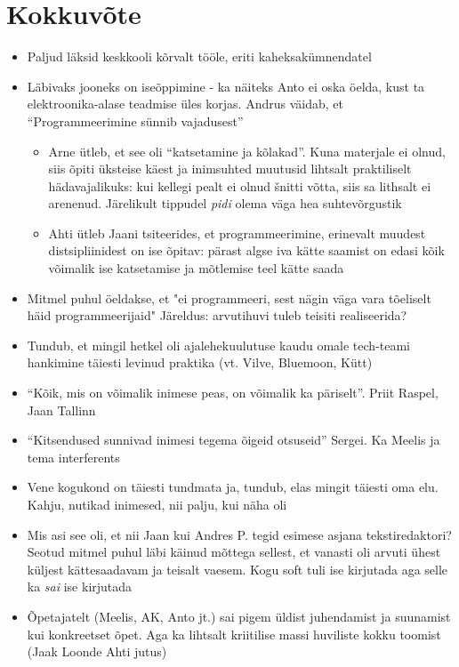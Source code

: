 \documentclass{tufte-book}
\begin{document}
\chapter{Kokkuvõte}
\begin{itemize}
	\item Paljud läksid keskkooli kõrvalt tööle, eriti kaheksakümnendatel
	\item Läbivaks jooneks on iseõppimine - ka näiteks Anto ei oska öelda, kust ta elektroonika-alase teadmise üles korjas. Andrus väidab, et \enquote{Programmeerimine sünnib vajadusest}
	\begin{itemize}
		\item Arne ütleb, et see oli \enquote{katsetamine ja kõlakad}. Kuna materjale ei olnud, siis õpiti üksteise käest ja inimsuhted muutusid lihtsalt praktiliselt hädavajalikuks: kui kellegi pealt ei olnud šnitti võtta, siis sa lithsalt ei arenenud. Järelikult tippudel \emph{pidi} olema väga hea suhtevõrgustik
		\item Ahti ütleb Jaani tsiteerides, et programmeerimine, erinevalt muudest distsipliinidest on ise õpitav: pärast algse iva kätte saamist on edasi kõik võimalik ise katsetamise ja mõtlemise teel kätte saada
	\end{itemize}
	\item Mitmel puhul öeldakse, et "ei programmeeri, sest nägin väga vara tõeliselt häid programmeerijaid" Järeldus: arvutihuvi tuleb teisiti realiseerida?
	\item Tundub, et mingil hetkel oli ajalehekuulutuse kaudu omale tech-teami hankimine täiesti levinud praktika (vt. Vilve, Bluemoon, Kütt)
	\item \enquote{Kõik, mis on võimalik inimese peas, on võimalik ka päriselt}. Priit Raspel, Jaan Tallinn
	\item \enquote{Kitsendused sunnivad inimesi tegema õigeid otsuseid} Sergei. Ka Meelis ja tema interferents
	\item Vene kogukond on täiesti tundmata ja, tundub, elas mingit täiesti oma elu. Kahju, nutikad inimesed, nii palju, kui näha oli
	\item Mis asi see oli, et nii Jaan kui Andres P. tegid esimese asjana tekstiredaktori? Seotud mitmel puhul läbi käinud mõttega sellest, et vanasti oli arvuti ühest küljest kättesaadavam ja teisalt vaesem. Kogu soft tuli ise kirjutada aga selle ka \emph{sai} ise kirjutada
	\item Õpetajatelt (Meelis, AK, Anto jt.) sai pigem üldist juhendamist ja suunamist kui konkreetset õpet. Aga ka lihtsalt kriitilise massi huviliste kokku toomist (Jaak Loonde Ahti jutus)

\end{itemize}
\end{document}
